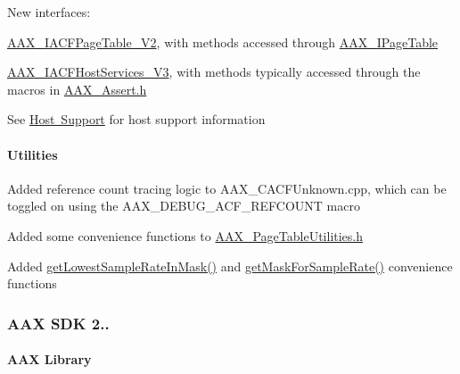 \begin{DoxyItemize}
\item New interfaces\+: 
\begin{DoxyItemize}
\item \mbox{\hyperlink{a01729}{A\+A\+X\+\_\+\+I\+A\+C\+F\+Page\+Table\+\_\+\+V2}}, with methods accessed through \mbox{\hyperlink{a01849}{A\+A\+X\+\_\+\+I\+Page\+Table}} 
\item \mbox{\hyperlink{a01721}{A\+A\+X\+\_\+\+I\+A\+C\+F\+Host\+Services\+\_\+\+V3}}, with methods typically accessed through the macros in \mbox{\hyperlink{a00395}{A\+A\+X\+\_\+\+Assert.\+h}} 
\end{DoxyItemize}See \mbox{\hyperlink{a00845}{Host Support}} for host support information  
\end{DoxyItemize}\hypertarget{a00847_aax_sdk_2p3p1_Utilities}{}\paragraph{Utilities}\label{a00847_aax_sdk_2p3p1_Utilities}

\begin{DoxyItemize}
\item Added reference count tracing logic to A\+A\+X\+\_\+\+C\+A\+C\+F\+Unknown.\+cpp, which can be toggled on using the {\ttfamily A\+A\+X\+\_\+\+D\+E\+B\+U\+G\+\_\+\+A\+C\+F\+\_\+\+R\+E\+F\+C\+O\+U\+NT} macro  
\item Added some convenience functions to \mbox{\hyperlink{a00650}{A\+A\+X\+\_\+\+Page\+Table\+Utilities.\+h}}  
\item Added \mbox{\hyperlink{a00392_a7ed6789141267c2270b49ef9a38bd55a}{get\+Lowest\+Sample\+Rate\+In\+Mask()}} and \mbox{\hyperlink{a00392_a35608eb248567091abba77878fb87eab}{get\+Mask\+For\+Sample\+Rate()}} convenience functions  
\end{DoxyItemize}\hypertarget{a00847_aax_sdk_2p3p0}{}\subsubsection{A\+A\+X S\+D\+K 2..}\label{a00847_aax_sdk_2p3p0}
\hypertarget{a00847_aax_sdk_2p3p0_AAXLibrary}{}\paragraph{A\+A\+X Library}\label{a00847_aax_sdk_2p3p0_AAXLibrary}

